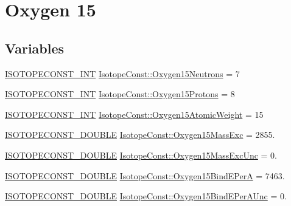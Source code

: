\hypertarget{group___isotope_const-_oxygen-_o15}{}\section{Oxygen 15}
\label{group___isotope_const-_oxygen-_o15}
\subsection*{Variables}
\begin{DoxyCompactItemize}
\item 
\mbox{\hyperlink{group___isotope_const-_macros_ga5f18360b3e99483a35c32d789e62621c}{I\+S\+O\+T\+O\+P\+E\+C\+O\+N\+S\+T\+\_\+\+I\+NT}} \mbox{\hyperlink{group___isotope_const-_oxygen-_o15_ga9b186c3dd37609a0deebb14237d50cfd}{Isotope\+Const\+::\+Oxygen15\+Neutrons}} = 7
\item 
\mbox{\hyperlink{group___isotope_const-_macros_ga5f18360b3e99483a35c32d789e62621c}{I\+S\+O\+T\+O\+P\+E\+C\+O\+N\+S\+T\+\_\+\+I\+NT}} \mbox{\hyperlink{group___isotope_const-_oxygen-_o15_ga9efab98a324506ed2d1f80d1b0639cdb}{Isotope\+Const\+::\+Oxygen15\+Protons}} = 8
\item 
\mbox{\hyperlink{group___isotope_const-_macros_ga5f18360b3e99483a35c32d789e62621c}{I\+S\+O\+T\+O\+P\+E\+C\+O\+N\+S\+T\+\_\+\+I\+NT}} \mbox{\hyperlink{group___isotope_const-_oxygen-_o15_gaccb8bfae9b0dbcf65cbfe93d572240ff}{Isotope\+Const\+::\+Oxygen15\+Atomic\+Weight}} = 15
\item 
\mbox{\hyperlink{group___isotope_const-_macros_ga8f45a7272ce02c0b4c65c44636ed719a}{I\+S\+O\+T\+O\+P\+E\+C\+O\+N\+S\+T\+\_\+\+D\+O\+U\+B\+LE}} \mbox{\hyperlink{group___isotope_const-_oxygen-_o15_gaf4aa1155749c6478d37f9bfaa1a3957e}{Isotope\+Const\+::\+Oxygen15\+Mass\+Exc}} = 2855.
\item 
\mbox{\hyperlink{group___isotope_const-_macros_ga8f45a7272ce02c0b4c65c44636ed719a}{I\+S\+O\+T\+O\+P\+E\+C\+O\+N\+S\+T\+\_\+\+D\+O\+U\+B\+LE}} \mbox{\hyperlink{group___isotope_const-_oxygen-_o15_ga9c51a02d67f5d12fb15cd0484b148731}{Isotope\+Const\+::\+Oxygen15\+Mass\+Exc\+Unc}} = 0.
\item 
\mbox{\hyperlink{group___isotope_const-_macros_ga8f45a7272ce02c0b4c65c44636ed719a}{I\+S\+O\+T\+O\+P\+E\+C\+O\+N\+S\+T\+\_\+\+D\+O\+U\+B\+LE}} \mbox{\hyperlink{group___isotope_const-_oxygen-_o15_ga40bfc8ab0102bf554b81e10c0ad926b4}{Isotope\+Const\+::\+Oxygen15\+Bind\+E\+PerA}} = 7463.
\item 
\mbox{\hyperlink{group___isotope_const-_macros_ga8f45a7272ce02c0b4c65c44636ed719a}{I\+S\+O\+T\+O\+P\+E\+C\+O\+N\+S\+T\+\_\+\+D\+O\+U\+B\+LE}} \mbox{\hyperlink{group___isotope_const-_oxygen-_o15_ga580ac1b18980e0d72f6484f08bb28362}{Isotope\+Const\+::\+Oxygen15\+Bind\+E\+Per\+A\+Unc}} = 0.

\end{DoxyCompactItemize}
